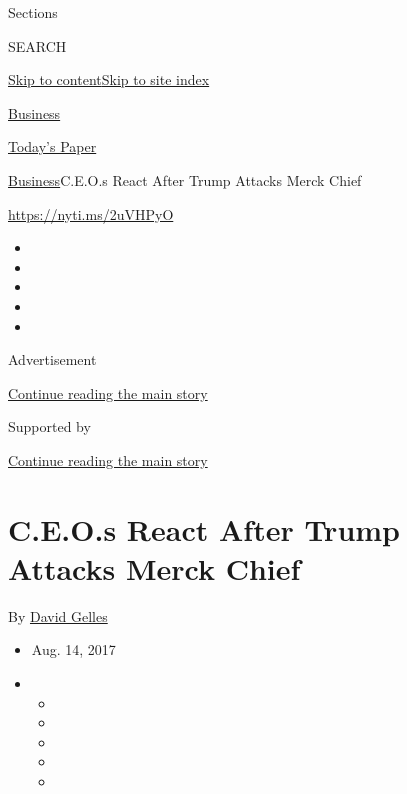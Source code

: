 Sections

SEARCH

\protect\hyperlink{site-content}{Skip to
content}\protect\hyperlink{site-index}{Skip to site index}

\href{https://www.nytimes3xbfgragh.onion/section/business}{Business}

\href{https://myaccount.nytimes3xbfgragh.onion/auth/login?response_type=cookie\&client_id=vi}{}

\href{https://www.nytimes3xbfgragh.onion/section/todayspaper}{Today's
Paper}

\href{/section/business}{Business}\textbar{}C.E.O.s React After Trump
Attacks Merck Chief

\url{https://nyti.ms/2uVHPyO}

\begin{itemize}
\item
\item
\item
\item
\item
\end{itemize}

Advertisement

\protect\hyperlink{after-top}{Continue reading the main story}

Supported by

\protect\hyperlink{after-sponsor}{Continue reading the main story}

\hypertarget{ceos-react-after-trump-attacks-merck-chief}{%
\section{C.E.O.s React After Trump Attacks Merck
Chief}\label{ceos-react-after-trump-attacks-merck-chief}}

By \href{http://www.nytimes3xbfgragh.onion/by/david-gelles}{David
Gelles}

\begin{itemize}
\item
  Aug. 14, 2017
\item
  \begin{itemize}
  \item
  \item
  \item
  \item
  \item
  \end{itemize}
\end{itemize}

